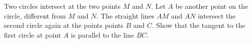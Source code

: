 Two circles intersect at the two points $M$ and $N$. Let $A$ be another point on the circle,
different from $M$ and $N$. The straight lines $AM$ and $AN$ intersect the second
circle again at the points points $B$ and $C$.
Show that the tangent to the first circle at point $A$ is parallel to the line $BC$.